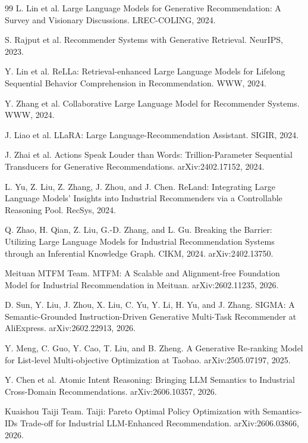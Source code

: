 \documentclass[11pt]{article}
\begin{document}
\begin{thebibliography}{99}
L. Lin et al.
\newblock Large Language Models for Generative Recommendation: A Survey and Visionary Discussions.
\newblock LREC-COLING, 2024.

S. Rajput et al.
\newblock Recommender Systems with Generative Retrieval.
\newblock NeurIPS, 2023.

Y. Lin et al.
\newblock ReLLa: Retrieval-enhanced Large Language Models for Lifelong Sequential Behavior Comprehension in Recommendation.
\newblock WWW, 2024.

Y. Zhang et al.
\newblock Collaborative Large Language Model for Recommender Systems.
\newblock WWW, 2024.

J. Liao et al.
\newblock LLaRA: Large Language-Recommendation Assistant.
\newblock SIGIR, 2024.

J. Zhai et al.
\newblock Actions Speak Louder than Words: Trillion-Parameter Sequential Transducers for Generative Recommendations.
\newblock arXiv:2402.17152, 2024.

L. Yu, Z. Liu, Z. Zhang, J. Zhou, and J. Chen.
\newblock ReLand: Integrating Large Language Models' Insights into Industrial Recommenders via a Controllable Reasoning Pool.
\newblock RecSys, 2024.

Q. Zhao, H. Qian, Z. Liu, G.-D. Zhang, and L. Gu.
\newblock Breaking the Barrier: Utilizing Large Language Models for Industrial Recommendation Systems through an Inferential Knowledge Graph.
\newblock CIKM, 2024. arXiv:2402.13750.

Meituan MTFM Team.
\newblock MTFM: A Scalable and Alignment-free Foundation Model for Industrial Recommendation in Meituan.
\newblock arXiv:2602.11235, 2026.

D. Sun, Y. Liu, J. Zhou, X. Liu, C. Yu, Y. Li, H. Yu, and J. Zhang.
\newblock SIGMA: A Semantic-Grounded Instruction-Driven Generative Multi-Task Recommender at AliExpress.
\newblock arXiv:2602.22913, 2026.

Y. Meng, C. Guo, Y. Cao, T. Liu, and B. Zheng.
\newblock A Generative Re-ranking Model for List-level Multi-objective Optimization at Taobao.
\newblock arXiv:2505.07197, 2025.

Y. Chen et al.
\newblock Atomic Intent Reasoning: Bringing LLM Semantics to Industrial Cross-Domain Recommendations.
\newblock arXiv:2606.10357, 2026.

Kuaishou Taiji Team.
\newblock Taiji: Pareto Optimal Policy Optimization with Semantics-IDs Trade-off for Industrial LLM-Enhanced Recommendation.
\newblock arXiv:2606.03866, 2026.


\end{thebibliography}
\end{document}
